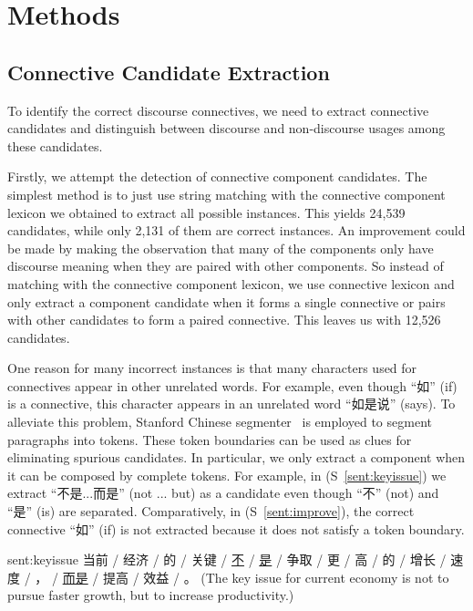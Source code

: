 %
%
%
\chapter{Methods}
\label{c:method}

\section{Connective Candidate Extraction}

To identify the correct discourse connectives, we need to
extract connective candidates and distinguish between discourse
and non-discourse usages among these candidates.

Firstly, we attempt the detection of connective component candidates.
The simplest method is to just use string matching with the connective
component lexicon we obtained to extract all possible instances. This yields
24,539 candidates, while only 2,131 of them are correct instances. An improvement
could be made by making the observation that many of the components only have
discourse meaning when they are paired with other components. So instead of matching
with the connective component lexicon, we use connective lexicon and only extract
a component candidate when it forms a single connective or pairs with
other candidates to form a paired connective. This leaves us with 12,526 candidates.

One reason for many incorrect instances is that many characters used for connectives
appear in other unrelated words. For example, even though ``如'' (if) is a connective,
this character appears in an unrelated word ``如是说'' (says). To alleviate this problem,
Stanford Chinese segmenter~\citep{chang2008optimizing} is employed to segment paragraphs
into tokens. These token boundaries can be used as clues for eliminating spurious candidates.
In particular, we only extract a component when it can be composed by complete tokens.
For example, in (S~\ref{sent:keyissue}) we extract ``不是...而是'' (not ... but) as a candidate
even though ``不'' (not) and ``是'' (is) are separated. Comparatively, in (S~\ref{sent:improve}),
the correct connective ``如'' (if) is not extracted because it does not satisfy a token boundary.

\begin{sent}{sent:keyissue}{}
    当前 / 经济 / 的 / 关键 / \underline{不} / \underline{是} / 争取 / 更 /
    高 / 的 / 增长 / 速度 / ， / \underline{而是} / 提高 / 效益 / 。
    (The key issue for current economy is not to pursue faster growth, but to
    increase productivity.)
\end{sent}

